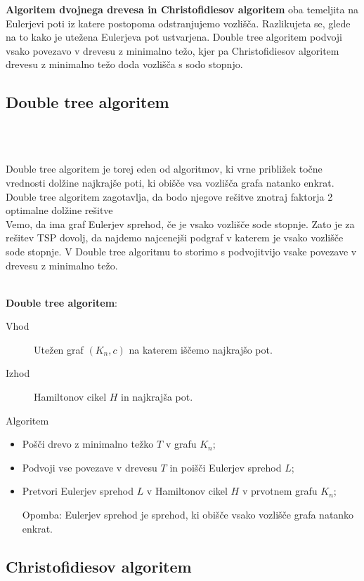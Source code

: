 \documentclass[12pt,a4paper]{amsart}
\theoremstyle{definition} %
\theoremstyle{plain} %
\begin{document}
\textbf{Algoritem dvojnega drevesa in Christofidiesov algoritem} oba temeljita na Eulerjevi poti iz katere postopoma odstranjujemo vozlišča.
Razlikujeta se, glede na to kako je utežena Eulerjeva pot ustvarjena. Double tree algoritem podvoji vsako povezavo v drevesu z minimalno težo, kjer pa Christofidiesov algoritem drevesu z minimalno težo doda vozlišča s sodo stopnjo.

\subsection{Double tree algoritem} \hfill\\\

Double tree algoritem je torej eden od algoritmov, ki vrne približek točne vrednosti dolžine najkrajše poti, ki obišče vsa vozlišča grafa natanko enkrat.
Double tree algoritem zagotavlja, da bodo njegove rešitve znotraj faktorja 2 optimalne dolžine rešitve\\
Vemo, da ima graf Eulerjev sprehod, če je vsako vozlišče sode stopnje. Zato je za rešitev TSP dovolj, da najdemo najcenejši podgraf v katerem je vsako vozlišče sode stopnje.
V Double tree algoritmu to storimo s podvojitvijo vsake povezave v drevesu z minimalno težo.
\hfil\\\

\textbf{Double tree algoritem}: 
\begin{description}
 \item[Vhod] Utežen graf $(K_n,c)$ na katerem iščemo najkrajšo pot.
 \item[Izhod] Hamiltonov cikel $H$ in najkrajša pot.
 \item[Algoritem]
\end{description}
\begin{itemize}
\item Pošči drevo z minimalno težko $T$ v grafu $K_n$;
\item Podvoji vse povezave v drevesu $T$ in poišči Eulerjev sprehod $L$;
\item Pretvori Eulerjev sprehod $L$ v Hamiltonov cikel $H$ v prvotnem grafu $K_n$;
\end{itemize}
\hfil
\begin{itemize}
\item[Opomba:] Eulerjev sprehod je sprehod, ki obišče vsako vozlišče grafa natanko enkrat.
\end{itemize}

\subsection{Christofidiesov algoritem} \hfill\\\
\end{document}
